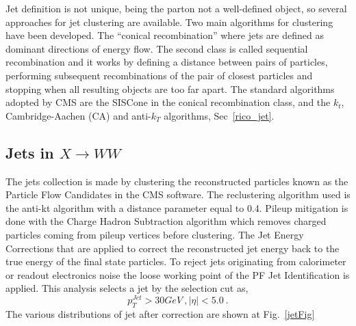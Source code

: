 Jet definition is not unique, being the parton not a well-defined object, so several
approaches for jet clustering are available. Two main algorithms for clustering have been developed. The ``conical recombination''
where jets are defined as dominant directions of energy flow.  The second class is called sequential recombination and it works by defining a distance
between pairs of particles, performing subsequent recombinations of the pair of closest
particles and stopping when all resulting objects are too far apart. The standard algorithms adopted by
CMS are the SISCone in the conical recombination class, and the $k_t$, Cambridge-Aachen (CA) and anti-$k_T$ algorithms, Sec~\ref{rico_jet}.\\
\newline

\subsection*{Jets in $X \to WW$}
The jets collection is made by clustering the reconstructed particles known as the Particle Flow
Candidates in the CMS software. The reclustering algorithm used is the anti-kt algorithm with
a distance parameter equal to 0.4. Pileup mitigation is done with the Charge Hadron Subtraction  algorithm 
which removes charged particles coming from pileup vertices before
clustering.
The Jet Energy Corrections  that are applied to correct the reconstructed jet energy back
to the true energy of the final state particles.  To reject jets originating
from calorimeter or readout electronics noise the loose working point of the PF Jet Identification is applied. 
This analysis selects a jet by the selection cut as,
\begin{equation}
 p_T^{Jet} > 30 GeV \: , |\eta| < 5.0 \: .
\end{equation}
The various distributions of jet after correction are shown at Fig.~\ref{jetFig}
